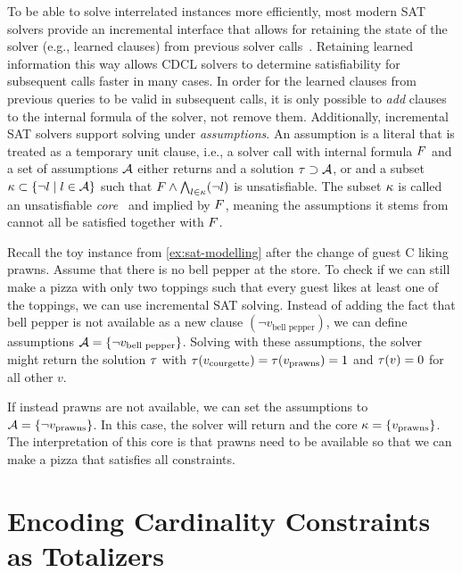 To be able to solve interrelated instances more efficiently, most modern SAT solvers provide an incremental interface that allows for retaining the state of the solver (e.g., learned clauses) from previous solver calls~\autocites{DBLP:journals/entcs/EenS03,handbook2-cdcl}.
Retaining learned information this way allows CDCL solvers to determine satisfiability for subsequent calls faster in many cases.
In order for the learned clauses from previous queries to be valid in subsequent calls, it is only possible to \emph{add} clauses to the internal formula of the solver, not remove them.
Additionally, incremental SAT solvers support solving under \emph{assumptions}.
An assumption is a literal that is treated as a temporary unit clause, i.e., a solver call with internal formula $F$ and a set of assumptions $\mathcal{A}$ either returns \sat{} and a solution $\tau \supset \mathcal{A}$, or \unsat{} and a subset $\kappa \subset \{\lnot l \mid l\in\mathcal{A}\}$ such that $F \land \bigwedge_{l \in \kappa} (\lnot l)$ is unsatisfiable.
The subset $\kappa$ is called an unsatisfiable \emph{core}~\autocite{handbook2-cdcl} and implied by $F$, meaning the assumptions it stems from cannot all be satisfied together with $F$.

\begin{example}\label{ex:inc-sat}
  Recall the toy instance from \cref{ex:sat-modelling} after the change of guest C liking prawns.
  Assume that there is no bell pepper at the store.
  To check if we can still make a pizza with only two toppings such that every guest likes at least one of the toppings, we can use incremental SAT solving.
  Instead of adding the fact that bell pepper is not available as a new clause $(\lnot v_\text{bell pepper})$, we can define assumptions $\mathcal{A}=\{\lnot v_\text{bell pepper}\}$.
  Solving with these assumptions, the solver might return the solution $\tau$ with $\tau(v_\text{courgette}) = \tau(v_\text{prawns}) = 1$ and $\tau(v) = 0$ for all other $v$.

  If instead prawns are not available, we can set the assumptions to $\mathcal{A}=\{\lnot v_\text{prawns}\}$.
  In this case, the solver will return \unsat{} and the core $\kappa=\{v_\text{prawns}\}$.
  The interpretation of this core is that prawns need to be available so that we can make a pizza that satisfies all constraints.
\end{example}

\section{Encoding Cardinality Constraints as Totalizers\label{sec:card-const}}

